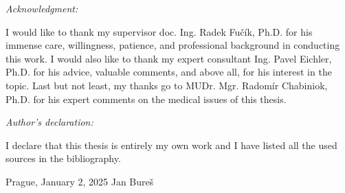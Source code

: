 \newpage
\noindent \vspace*{0pt} %
\emph{\Large{}Acknowledgment:}{\Large\par}

\noindent I would like to thank my supervisor doc. Ing. Radek Fučík, Ph.D. for his immense care, willingness, patience, and professional background in conducting this work. I would also like to thank my expert consultant Ing. Pavel Eichler, Ph.D. for his advice, valuable comments, and above all, for his interest in the topic. Last but not least, my thanks go to MUDr. Mgr. Radomír Chabiniok, Ph.D. for his expert comments on the medical issues of this thesis.

\vspace*{\fill} %

\noindent \emph{\Large{}Author’s declaration:}{\Large\par}

\noindent I declare that this thesis is entirely my own work and I have listed all the used sources in the bibliography.

\bigskip{}

\noindent Prague, January 2, 2025 \hfill{}Jan Bureš

\newpage{}